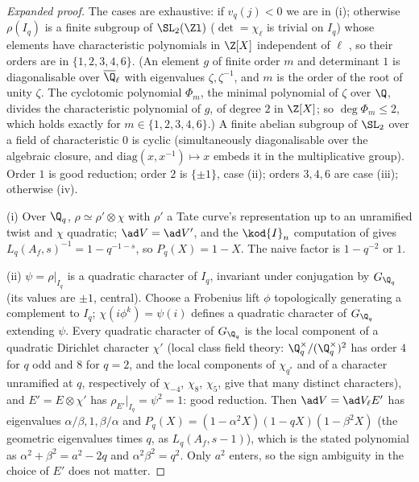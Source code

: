 \begin{sloppypar}
\begin{proof}[Expanded proof]
The cases are exhaustive: if $v_q(j)<0$ we are in (i); otherwise $\rho(I_q)$ is a finite subgroup of $\SL_2(\Zl)$ ($\det=\chi_\ell$ is trivial on $I_q$) whose elements have
characteristic polynomials in $\Z[X]$ independent of $\ell$ \cite[Section 2]{SerreTate68}, so their orders are in $\{1,2,3,4,6\}$. (An element $g$ of finite order $m$ and determinant $1$ is diagonalisable over
$\overline\Q_\ell$ with eigenvalues $\zeta,\zeta^{-1}$, and $m$ is the order of the root of unity $\zeta$. The cyclotomic polynomial $\Phi_m$, the minimal polynomial of $\zeta$ over $\Q$, divides the
characteristic polynomial of $g$, of degree $2$ in $\Z[X]$; so $\deg\Phi_m\le2$, which holds exactly for $m\in\{1,2,3,4,6\}$.) A finite abelian subgroup of $\SL_2$ over a field of
characteristic $0$ is cyclic (simultaneously diagonalisable over the algebraic closure, and $\mathrm{diag}(x,x^{-1})\mapsto x$ embeds it in the multiplicative group). Order $1$ is good
reduction; order $2$ is $\{\pm1\}$, case (ii); orders $3,4,6$ are case (iii); otherwise (iv).

(i) Over $\Q_q$, $\rho\simeq\rho'\otimes\chi$ with $\rho'$ a Tate curve's representation up to an unramified twist and $\chi$ quadratic; $\ad V=\ad V'$, and the $\kod{I}_n$ computation of
 gives $L_q(A_f,s)^{-1}=1-q^{-1-s}$, so $P_q(X)=1-X$. The naive factor is $1-q^{-2}$ or $1$.

(ii) $\psi=\rho|_{I_q}$ is a quadratic character of $I_q$, invariant under conjugation by $G_{\Q_q}$ (its values are $\pm1$, central). Choose a Frobenius lift $\phi$ topologically
generating a complement to $I_q$; $\chi(i\phi^k)=\psi(i)$ defines a quadratic character of $G_{\Q_q}$ extending $\psi$. Every quadratic character of $G_{\Q_q}$ is the local component of a
quadratic Dirichlet character $\chi'$ (local class field theory: $\Q_q^\times/(\Q_q^\times)^2$ has order $4$ for $q$ odd and $8$ for $q=2$, and the local components of $\chi_{q^*}$ and of a character
unramified at $q$, respectively of $\chi_{-4}$, $\chi_8$, $\chi_5$, give that many distinct characters), and $E'=E\otimes\chi'$ has $\rho_{E'}|_{I_q}=\psi^2=1$: good reduction. Then $\ad V=\ad V_\ell E'$ has eigenvalues
$\alpha/\beta,1,\beta/\alpha$ and $P_q(X)=(1-\alpha^2X)(1-qX)(1-\beta^2X)$ (the geometric eigenvalues times $q$, as $L_q(A_f,s-1)$), which is the stated polynomial as
$\alpha^2+\beta^2=a^2-2q$ and $\alpha^2\beta^2=q^2$. Only $a^2$ enters, so the sign ambiguity in the choice of $E'$ does not matter.


\end{proof}
\end{sloppypar}
